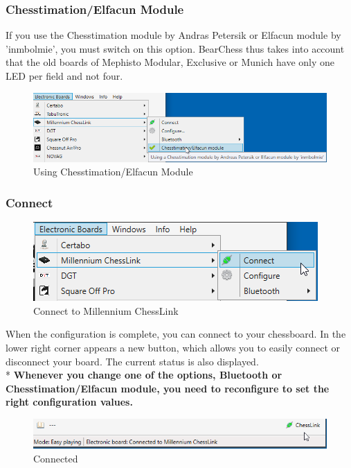 \documentclass[11pt,a4paper]{article}
\begin{document}
\subsubsection{Chesstimation/Elfacun Module}
If you use the Chesstimation module by Andras Petersik or Elfacun module by 'inmbolmie', you must switch on this option.
BearChess thus takes into account that the old boards of Mephisto Modular, Exclusive or Munich have only one LED per field and not four.
\begin{figure}[H]
	\centering
	\includegraphics[scale=0.6]{MillenniumChessLink13.png}
	\caption{Using Chesstimation/Elfacun Module}
	\label{fig:MillenniumChessLink13}
\end{figure}


\subsubsection{Connect}
\begin{figure}[H]
	\centering
	\includegraphics[scale=1.0]{MillenniumChessLink6.png}
	\caption{Connect to Millennium ChessLink}
	\label{fig:MillenniumChessLink6}
\end{figure}
When the configuration is complete, you can connect to your chessboard.
In the lower right corner appears a new button, which allows you to easily connect or disconnect your board. The current status is also displayed.\\
{\color{red}*}\textbf{ Whenever you change one of the options, Bluetooth or Chesstimation/Elfacun module, you need to reconfigure to set the right configuration values.}

\begin{figure}[H]
	\centering
	\includegraphics[scale=0.8]{MillenniumChessLink7.png}
	\caption{Connected}
	\label{fig:MillenniumChessLink7}
\end{figure}
\end{document}
